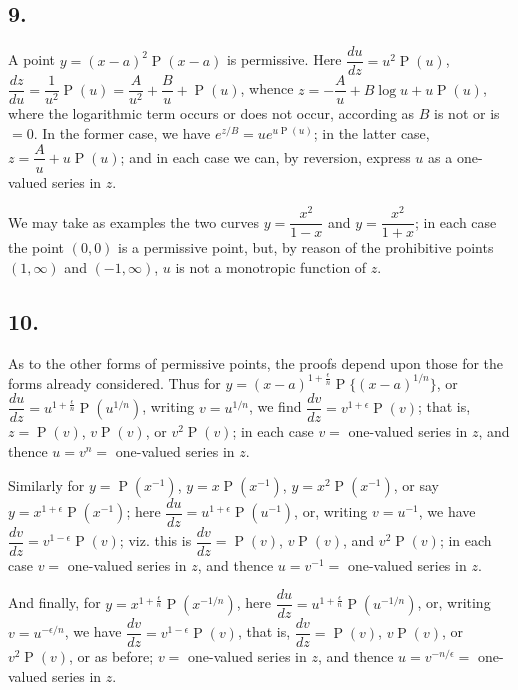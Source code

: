 \documentclass[11pt,a4paper]{article}
\theoremstyle{definition}
\DeclareMathOperator{\Pf}{P}
\begin{document}
\subsection*{9.}

A point $y = (x - a)^2 \Pf(x - a)$ is permissive. Here $\dfrac{du}{dz} = u^2 \Pf(u)$, $\dfrac{dz}{du} = \dfrac{1}{u^2}\Pf(u) = \dfrac{A}{u^2} + \dfrac{B}{u} + \Pf(u)$, whence $z = -\dfrac{A}{u} + B\log u + u\Pf(u)$, where the logarithmic term occurs or does not occur, according as $B$ is not or is $= 0$. In the former case, we have $e^{z/B} = u e^{u\Pf(u)}$; in the latter case, $z = \dfrac{A}{u} + u\Pf(u)$; and in each case we can, by reversion, express $u$ as a one-valued series in $z$.

We may take as examples the two curves $y = \dfrac{x^2}{1 - x}$ and $y = \dfrac{x^2}{1 + x}$; in each case the point $(0, 0)$ is a permissive point, but, by reason of the prohibitive points $(1, \infty)$ and $(-1, \infty)$, $u$ is not a monotropic function of $z$.

\subsection*{10.}

As to the other forms of permissive points, the proofs depend upon those for the forms already considered. Thus for $y = (x - a)^{1 + \frac{\epsilon}{n}} \Pf\{(x - a)^{1/n}\}$, or $\dfrac{du}{dz} = u^{1 + \frac{\epsilon}{n}} \Pf(u^{1/n})$, writing $v = u^{1/n}$, we find $\dfrac{dv}{dz} = v^{1 + \epsilon} \Pf(v)$; that is, $z = \Pf(v)$, $v\Pf(v)$, or $v^2\Pf(v)$; in each case $v =$ one-valued series in $z$, and thence $u = v^n =$ one-valued series in $z$.

Similarly for $y = \Pf(x^{-1})$, $y = x\Pf(x^{-1})$, $y = x^2\Pf(x^{-1})$, or say $y = x^{1 + \epsilon}\Pf(x^{-1})$; here $\dfrac{du}{dz} = u^{1 + \epsilon}\Pf(u^{-1})$, or, writing $v = u^{-1}$, we have $\dfrac{dv}{dz} = v^{1 - \epsilon}\Pf(v)$; viz. this is $\dfrac{dv}{dz} = \Pf(v)$, $v\Pf(v)$, and $v^2\Pf(v)$; in each case $v =$ one-valued series in $z$, and thence $u = v^{-1} =$ one-valued series in $z$.

And finally, for $y = x^{1 + \frac{\epsilon}{n}} \Pf(x^{-1/n})$, here $\dfrac{du}{dz} = u^{1 + \frac{\epsilon}{n}} \Pf(u^{-1/n})$, or, writing $v = u^{-\epsilon/n}$, we have $\dfrac{dv}{dz} = v^{1 - \epsilon}\Pf(v)$, that is, $\dfrac{dv}{dz} = \Pf(v)$, $v\Pf(v)$, or $v^2\Pf(v)$, or as before; $v =$ one-valued series in $z$, and thence $u = v^{-n/\epsilon} =$ one-valued series in $z$.
\end{document}
